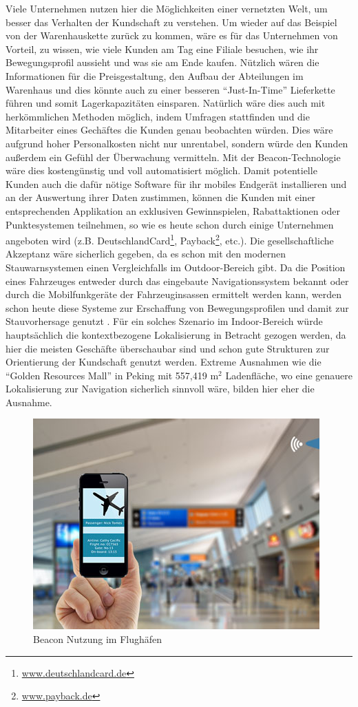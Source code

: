 Viele Unternehmen nutzen hier die Möglichkeiten einer vernetzten Welt, um besser das Verhalten der Kundschaft zu verstehen. Um wieder auf das Beispiel von der Warenhauskette zurück zu kommen, wäre es für das Unternehmen von Vorteil, zu wissen, wie viele Kunden am Tag eine Filiale besuchen, wie ihr Bewegungsprofil aussieht und was sie am Ende kaufen. Nützlich wären die Informationen für die Preisgestaltung, den Aufbau der Abteilungen im Warenhaus und dies könnte auch zu einer besseren "`Just-In-Time"' Lieferkette führen und somit Lagerkapazitäten einsparen. Natürlich wäre dies auch mit herkömmlichen Methoden möglich, indem Umfragen stattfinden und die Mitarbeiter eines Gechäftes die Kunden genau beobachten würden. Dies wäre aufgrund hoher Personalkosten nicht nur unrentabel, sondern würde den Kunden außerdem ein Gefühl der Überwachung vermitteln. Mit der Beacon-Technologie wäre dies kostengünstig und voll automatisiert möglich. Damit potentielle Kunden auch die dafür nötige Software für ihr mobiles Endgerät installieren und an der Auswertung ihrer Daten zustimmen, können die Kunden mit einer entsprechenden Applikation an exklusiven Gewinnspielen, Rabattaktionen oder Punktesystemen teilnehmen, so wie es heute schon durch einige Unternehmen angeboten wird (z.B. DeutschlandCard\footnote{\url{www.deutschlandcard.de}}, Payback\footnote{\url{www.payback.de}}, etc.). Die gesellschaftliche Akzeptanz wäre sicherlich gegeben, da es schon mit den modernen Stauwarnsystemen einen Vergleichfalls im Outdoor-Bereich gibt. Da die Position eines Fahrzeuges entweder durch das eingebaute Navigationssystem bekannt oder durch die Mobilfunkgeräte der Fahrzeuginsassen ermittelt werden kann, werden schon heute diese Systeme zur Erschaffung von Bewegungsprofilen und damit zur Stauvorhersage genutzt \cite{Stau}. Für ein solches Szenario im Indoor-Bereich würde hauptsächlich die kontextbezogene Lokalisierung in Betracht gezogen werden, da hier die meisten Geschäfte überschaubar sind und schon gute Strukturen zur Orientierung der Kundschaft genutzt werden. Extreme Ausnahmen wie die "`Golden Resources Mall"' in Peking mit 557,419 $\text{m}^2$ Ladenfläche, wo eine genauere Lokalisierung zur Navigation sicherlich sinnvoll wäre, bilden hier eher die Ausnahme. \par\bigskip
\begin{figure} 
\centering
\includegraphics[scale=0.5]{Bilder/iBeaconAirport}
\caption{Beacon Nutzung im Flughäfen \cite{Airpo}}
\label{Airpo}
\end{figure}
